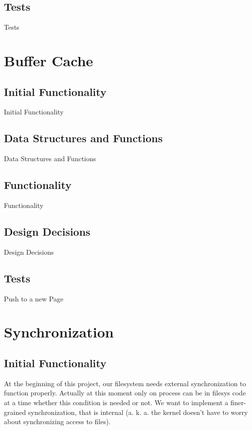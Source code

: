 \subsection{Tests}

Tests

\section{Buffer Cache}
\subsection{Initial Functionality}

Initial Functionality
  

\subsection{Data Structures and Functions}
  
Data Structures and Functions

\subsection{Functionality}
  
Functionality

\subsection{Design Decisions}
  
Design Decisions

\subsection{Tests}

Push to a new Page

\section{Synchronization}
\subsection{Initial Functionality}

At the beginning of this project, our filesystem needs external synchronization to function properly. Actually at this moment only on process can be in filesys code at a time whether this condition is needed or not. We want to implement a finer-grained synchronization, that is internal (a. k. a. the kernel doesn't have to worry about synchronizing access to files).
  

